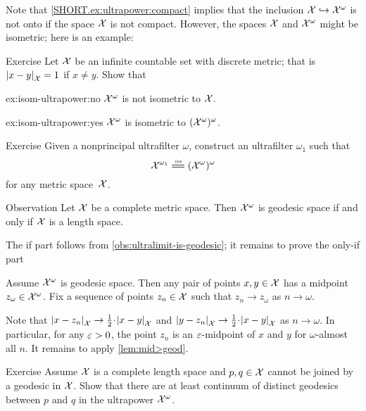 Note that \ref{SHORT.ex:ultrapower:compact} implies that the inclusion $\mathcal{X}\hookrightarrow\mathcal{X}^\omega$ is not onto if the space $\mathcal{X}$ is not compact.
However, the spaces $\mathcal{X}$ and $\mathcal{X}^\omega$ might be isometric; here is an example:

\begin{thm}{Exercise}\label{ex:isom-ultrapower}
Let $\mathcal{X}$ be an infinite countable set with discrete metric;
that is $\dist{x}{y}{\spc{X}}=1$ if $x\ne y$.
Show that 

\begin{subthm}{ex:isom-ultrapower:no}
$\mathcal{X}^\omega$ is not isometric to $\mathcal{X}$.
\end{subthm}

\begin{subthm}{ex:isom-ultrapower:yes}
$\mathcal{X}^\omega$ is  isometric to $(\mathcal{X}^\omega)^\omega$.
\end{subthm}

\end{thm}

\begin{thm}{Exercise}\label{ex:ultrapower(ultrapower)}
Given a nonprincipal ultrafilter $\omega$, construct an ultrafilter $\omega_1$ such that 
\[\spc{X}^{\omega_1}\iso(\spc{X}^\omega)^\omega\]
for any metric space~$\mathcal{X}$.

\end{thm}


\begin{thm}{Observation}\label{obs:ultrapower-is-geodesic}
Let $\mathcal{X}$ be a complete metric space. 
Then $\mathcal{X}^\omega$ is geodesic space if and only if $\mathcal{X}$ is a length space.
\end{thm}

The if part follows from \ref{obs:ultralimit-is-geodesic}; it remains to prove the only-if part

Assume $\mathcal{X}^\omega$ is geodesic space.
Then any pair of points $x,y\in \mathcal{X}$ has a midpoint $z_\omega\in\mathcal{X}^\omega$.
Fix a sequence of points $z_n\in  \mathcal{X}$ such that $z_n\to z_\omega$ as $n\to \omega$.

Note that 
$\dist{x}{z_n}{\spc{X}}\to \tfrac12\cdot \dist{x}{y}{\spc{X}}$
and 
$\dist{y}{z_n}{\spc{X}}\to \tfrac12\cdot \dist{x}{y}{\spc{X}}$
as 
$n\to\omega$.
In particular, for any $\varepsilon>0$, the point $z_n$ is an $\varepsilon$-midpoint of $x$ and $y$ for $\omega$-almost all $n$.
It remains to apply \ref{lem:mid>geod}.
\qeds

\begin{thm}{Exercise}\label{ex:two-geodesics-in-ultrapower}
Assume $\mathcal{X}$ is a complete length space 
and $p,q\in\mathcal{X}$ cannot be joined by a geodesic in $\mathcal{X}$.  
Show that there are at least continuum of distinct geodesics between $p$ and $q$ 
in the ultrapower $\mathcal{X}^\omega$.
\end{thm}

